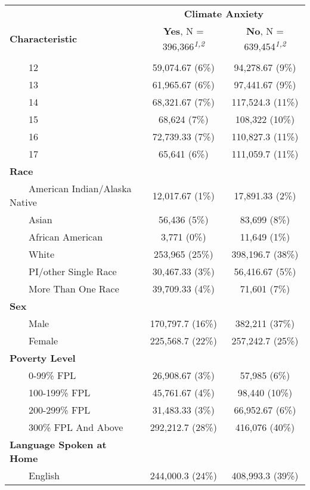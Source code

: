 \begin{table}[t]
\fontsize{12.0pt}{14.4pt}\selectfont
\begin{tabular*}{\linewidth}{@{\extracolsep{\fill}}lcc}
\toprule
 & \multicolumn{2}{c}{\textbf{Climate Anxiety}} \\ 
\cmidrule(lr){2-3}
\textbf{Characteristic} & \textbf{Yes}, N = 396,366\textsuperscript{\textit{1,2}} & \textbf{No}, N = 639,454\textsuperscript{\textit{1,2}} \\ 
\midrule\addlinespace[2.5pt]
{\bfseries Age} &  &  \\ 
    12 & 59,074.67 (6\%)  & 94,278.67 (9\%)  \\ 
    13 & 61,965.67 (6\%)  & 97,441.67 (9\%)  \\ 
    14 & 68,321.67 (7\%)  & 117,524.3 (11\%)  \\ 
    15 & 68,624 (7\%)  & 108,322 (10\%)  \\ 
    16 & 72,739.33 (7\%)  & 110,827.3 (11\%)  \\ 
    17 & 65,641 (6\%)  & 111,059.7 (11\%)  \\ 
{\bfseries Race} &  &  \\ 
    American Indian/Alaska Native & 12,017.67 (1\%)  & 17,891.33 (2\%)  \\ 
    Asian & 56,436 (5\%)  & 83,699 (8\%)  \\ 
    African American & 3,771 (0\%)  & 11,649 (1\%)  \\ 
    White & 253,965 (25\%)  & 398,196.7 (38\%)  \\ 
    PI/other Single Race & 30,467.33 (3\%)  & 56,416.67 (5\%)  \\ 
    More Than One Race & 39,709.33 (4\%)  & 71,601 (7\%)  \\ 
{\bfseries Sex} &  &  \\ 
    Male & 170,797.7 (16\%)  & 382,211 (37\%)  \\ 
    Female & 225,568.7 (22\%)  & 257,242.7 (25\%)  \\ 
{\bfseries Poverty Level} &  &  \\ 
    0-99\% FPL & 26,908.67 (3\%)  & 57,985 (6\%)  \\ 
    100-199\% FPL & 45,761.67 (4\%)  & 98,440 (10\%)  \\ 
    200-299\% FPL & 31,483.33 (3\%)  & 66,952.67 (6\%)  \\ 
    300\% FPL And Above & 292,212.7 (28\%)  & 416,076 (40\%)  \\ 
{\bfseries Language Spoken at Home} &  &  \\ 
    English & 244,000.3 (24\%)  & 408,993.3 (39\%)  \\ 

\end{tabular*}
\end{table}
